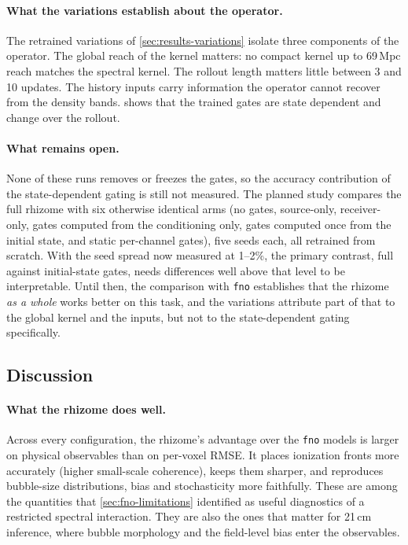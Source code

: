 \paragraph{What the variations establish about the operator.} The retrained variations of \cref{sec:results-variations} isolate three components of the operator. The global reach of the kernel matters: no compact kernel up to 69\,Mpc reach matches the spectral kernel. The rollout length matters little between 3 and 10 updates. The history inputs carry information the operator cannot recover from the density bands.  shows that the trained gates are state dependent and change over the rollout.

\paragraph{What remains open.} None of these runs removes or freezes the gates, so the accuracy contribution of the state-dependent gating is still not measured. The planned study compares the full rhizome with six otherwise identical arms (no gates, source-only, receiver-only, gates computed from the conditioning only, gates computed once from the initial state, and static per-channel gates), five seeds each, all retrained from scratch. With the seed spread now measured at 1--2\%, the primary contrast, full against initial-state gates, needs differences well above that level to be interpretable. Until then, the comparison with \texttt{fno} establishes that the rhizome \emph{as a whole} works better on this task, and the variations attribute part of that to the global kernel and the inputs, but not to the state-dependent gating specifically.

\subsection{Discussion}
\label{sec:discussion}

\paragraph{What the rhizome does well.} Across every configuration, the rhizome's advantage over the \texttt{fno} models is larger on physical observables than on per-voxel RMSE. It places ionization fronts more accurately (higher small-scale coherence), keeps them sharper, and reproduces bubble-size distributions, bias and stochasticity more faithfully. These are among the quantities that \cref{sec:fno-limitations} identified as useful diagnostics of a restricted spectral interaction. They are also the ones that matter for 21\,cm inference, where bubble morphology and the field-level bias enter the observables.


